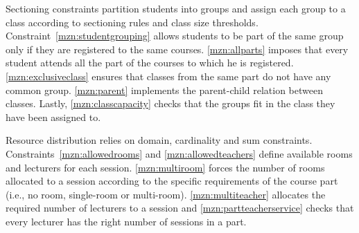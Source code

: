 %
Sectioning constraints partition students into groups and assign each group to a class according to sectioning rules and class size thresholds.
Constraint~\ref{mzn:studentgrouping} allows students to be part of the same group only if they are registered to the same courses.
\ref{mzn:allparts} imposes that every student attends all the part of the courses to which he is registered.
\ref{mzn:exclusiveclass} ensures that classes from the same part do not have any common group.
\ref{mzn:parent} implements the parent-child relation between classes.
Lastly, \ref{mzn:classcapacity} checks that the groups fit in the class they have been assigned to.


%
Resource distribution relies on domain, cardinality and sum constraints.
Constraints~\ref{mzn:allowedrooms} and \ref{mzn:allowedteachers} define available rooms and lecturers for each session.
\ref{mzn:multiroom} forces the number of rooms allocated to a session according to the specific requirements of the course part (i.e., no room, single-room or multi-room).
\ref{mzn:multiteacher} allocates the required number of lecturers to a session and \ref{mzn:partteacherservice} checks that every lecturer has the right number of sessions in a part.

